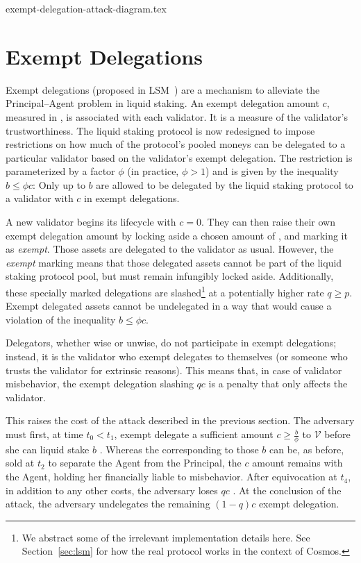 {exempt-delegation-attack-diagram.tex}

\section{Exempt Delegations}

Exempt delegations (proposed in LSM~\cite{liquidity-staking-module})
are a mechanism to alleviate the Principal--Agent problem in liquid staking.
An exempt delegation amount $c$, measured in \asset, is associated
with each validator. It is a measure of the validator's trustworthiness.
The liquid staking protocol is now redesigned to impose restrictions
on how much of the protocol's pooled moneys can be delegated to a particular
validator based on the validator's exempt delegation.
The restriction is
parameterized by a factor $\phi$ (in practice, $\phi > 1$)
and is given by the inequality $b \leq \phi c$: Only up to $b$ \assets
are allowed to be delegated by the liquid staking protocol
to a validator with $c$ \assets in exempt delegations.

A new validator begins its lifecycle with $c = 0$. They can then
raise their own exempt delegation amount by locking aside a
chosen amount of \asset, and marking it as \emph{exempt}. Those
assets are delegated to the validator as usual. However,
the \emph{exempt}
marking means that those delegated assets cannot be part of the liquid
staking protocol pool, but must remain infungibly locked aside. Additionally,
these specially marked delegations are slashed\footnote{We abstract some
of the irrelevant implementation details here. See Section~\ref{sec:lsm}
for how the real protocol works in the context of Cosmos.}
at a potentially higher rate $q \geq p$. Exempt delegated assets cannot
be undelegated in a way that would cause a violation of the inequality
$b \leq \phi c$.

Delegators, whether wise or unwise, do not participate in exempt
delegations; instead, it is the validator who exempt delegates to
themselves (or someone who trusts the validator for extrinsic reasons).
This means that, in case of validator misbehavior, the exempt delegation
slashing $qc$ is a penalty that only affects the validator.

This raises
the cost of the attack described in the previous section. The
adversary must first, at time $t_0 < t_1$, exempt delegate a sufficient amount
$c \geq \frac{b}{\phi}$ \asset to $\mathcal{V}$ before she can liquid stake $b$ \asset.
Whereas the \stassets
corresponding to those $b$ \assets can be, as before, sold at $t_2$ to
separate the Agent from the Principal, the $c$ amount remains with the
Agent, holding her financially liable to misbehavior. After equivocation at $t_4$,
in addition to any other costs, the adversary loses $qc$ \asset. At the conclusion
of the attack, the adversary undelegates the remaining $(1 - q)c$ exempt delegation.

